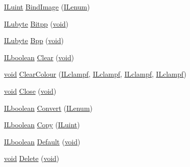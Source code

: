 \begin{DoxyCompactItemize}
\item 
\hyperlink{il_8h_ac6508d0e9c19e32f32e00d54b5b8cf30}{I\-Luint} \hyperlink{classil_image_aaa9fa63dfc2eae92d7f43716785f71a7}{Bind\-Image} (\hyperlink{il_8h_a1542f3a70c0c5370a30a1fa5ce349e2d}{I\-Lenum})
\item 
\hyperlink{il_8h_a8d2f04500100a86d1b00e98ab1b15a33}{I\-Lubyte} \hyperlink{classil_image_afdd677ec2aa714d8026067de73995e42}{Bitpp} (\hyperlink{il_8h_a5530e04d947bcddd83639ea7940faf10}{void})
\item 
\hyperlink{il_8h_a8d2f04500100a86d1b00e98ab1b15a33}{I\-Lubyte} \hyperlink{classil_image_aa72b7ec42222587ef0a1bc0ec2e9196b}{Bpp} (\hyperlink{il_8h_a5530e04d947bcddd83639ea7940faf10}{void})
\item 
\hyperlink{il_8h_a8be80d75c2c636b9f2250fe10c2e7874}{I\-Lboolean} \hyperlink{classil_image_a27bbce7a430fa91e11509cd23743458b}{Clear} (\hyperlink{il_8h_a5530e04d947bcddd83639ea7940faf10}{void})
\item 
\hyperlink{il_8h_a5530e04d947bcddd83639ea7940faf10}{void} \hyperlink{classil_image_ab16ae5beee48feea3ade76dc6635029a}{Clear\-Colour} (\hyperlink{il_8h_ad0325dd7e3fdd55546edbb20253095fa}{I\-Lclampf}, \hyperlink{il_8h_ad0325dd7e3fdd55546edbb20253095fa}{I\-Lclampf}, \hyperlink{il_8h_ad0325dd7e3fdd55546edbb20253095fa}{I\-Lclampf}, \hyperlink{il_8h_ad0325dd7e3fdd55546edbb20253095fa}{I\-Lclampf})
\item 
\hyperlink{il_8h_a5530e04d947bcddd83639ea7940faf10}{void} \hyperlink{classil_image_a9346a35b44811828dc424826472d2417}{Close} (\hyperlink{il_8h_a5530e04d947bcddd83639ea7940faf10}{void})
\item 
\hyperlink{il_8h_a8be80d75c2c636b9f2250fe10c2e7874}{I\-Lboolean} \hyperlink{classil_image_a05d4dc7141ac5d2095c0b683d427c8cc}{Convert} (\hyperlink{il_8h_a1542f3a70c0c5370a30a1fa5ce349e2d}{I\-Lenum})
\item 
\hyperlink{il_8h_a8be80d75c2c636b9f2250fe10c2e7874}{I\-Lboolean} \hyperlink{classil_image_a5cf0ce15af981935b8e17923d4433e5e}{Copy} (\hyperlink{il_8h_ac6508d0e9c19e32f32e00d54b5b8cf30}{I\-Luint})
\item 
\hyperlink{il_8h_a8be80d75c2c636b9f2250fe10c2e7874}{I\-Lboolean} \hyperlink{classil_image_a684d6d764ef94869990b84e06aa879d2}{Default} (\hyperlink{il_8h_a5530e04d947bcddd83639ea7940faf10}{void})
\item 
\hyperlink{il_8h_a5530e04d947bcddd83639ea7940faf10}{void} \hyperlink{classil_image_aa5eb85a6ac5bbe0b77e346074576db1a}{Delete} (\hyperlink{il_8h_a5530e04d947bcddd83639ea7940faf10}{void})
\item 

\end{DoxyCompactItemize}
